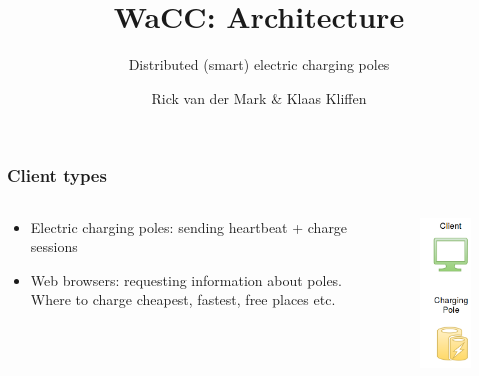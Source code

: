 \documentclass[11pt]{beamer}
\title{WaCC: Architecture}
\subtitle{Distributed (smart) electric charging poles}
\author{Rick van der Mark \& Klaas Kliffen}
\begin{document}
\maketitle

\begin{frame}
\frametitle{Client types}
\begin{columns}
    \begin{column}{.5\textwidth}
        \begin{itemize}
            \item Electric charging poles: sending heartbeat + charge sessions
            \item Web browsers: requesting information about poles. Where to charge cheapest, fastest, free places etc.
        \end{itemize}
    \end{column}
    \begin{column}{.5\textwidth}
        \begin{figure}
        \centering
        \includegraphics[scale=.4]{clients.png}
        \end{figure}
    \end{column}
\end{columns}
\end{frame}
\end{document}

